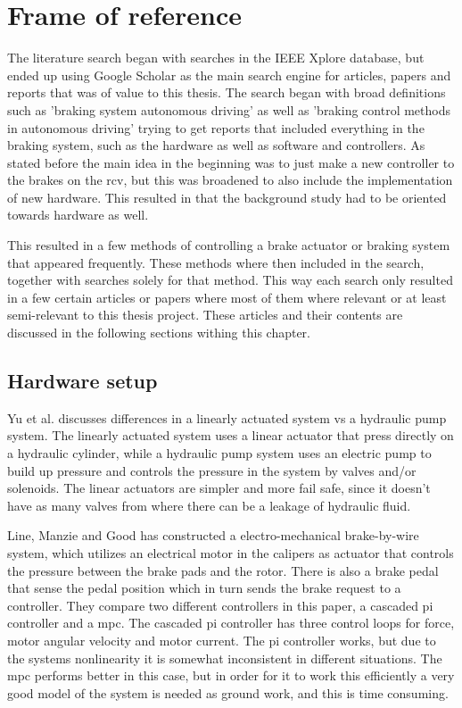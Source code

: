 \documentclass[a4paper,11pt]{kth-mag}
\begin{document}
\section{Frame of reference}
The literature search began with searches in the IEEE Xplore database, but ended up using Google Scholar as the main search engine for articles, papers and reports that was of value to this thesis. The search began with broad definitions such as 'braking system autonomous driving' as well as 'braking control methods in autonomous driving' trying to get reports that included everything in the braking system, such as the hardware as well as software and controllers. As stated before the main idea in the beginning was to just make a new controller to the brakes on the \gls{rcv}, but this was broadened to also include the implementation of new hardware. This resulted in that the background study had to be oriented towards hardware as well. 

This resulted in a few methods of controlling a brake actuator or braking system that appeared frequently. These methods where then included in the search, together with searches solely for that method. This way each search only resulted in a few certain articles or papers where most of them where relevant or at least semi-relevant to this thesis project. These articles and their contents are discussed in the following sections withing this chapter.


\subsection{Hardware setup}
Yu et al. \cite{Yu} discusses differences in a linearly actuated system vs a hydraulic pump system. The linearly actuated system uses a linear actuator that press directly on a hydraulic cylinder, while a hydraulic pump system uses an electric pump to build up pressure and controls the pressure in the system by valves and/or solenoids. The linear actuators are simpler and more fail safe, since it doesn't have as many valves from where there can be a leakage of hydraulic fluid. 


\vspace{5mm}
Line, Manzie and Good \cite{4475522} has constructed a electro-mechanical  brake-by-wire system, which utilizes an electrical motor in the calipers as actuator that controls the pressure between the brake pads and the rotor. There is also a brake pedal that sense the pedal position which in turn sends the brake request to a controller. They compare two different controllers in this paper, a cascaded \gls{pi} controller and a \gls{mpc}. The cascaded \gls{pi} controller has three control loops for force, motor angular velocity and motor current. The \gls{pi} controller works, but due to the systems nonlinearity it is somewhat inconsistent in different situations. The \gls{mpc} performs better in this case, but in order for it to work this efficiently a very good model of the system is needed as ground work, and this is time consuming. \newline
\end{document}
